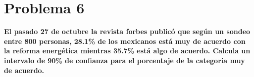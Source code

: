 \section*{Problema 6}

\textbf{El pasado 27 de octubre la revista forbes publicó que según un sondeo entre 800 personas, 28.1\% de los mexicanos está muy de acuerdo con la reforma energética mientras 35.7\% está algo de acuerdo. Calcula un intervalo de 90\% de confianza para el porcentaje de la categoria muy de acuerdo.}